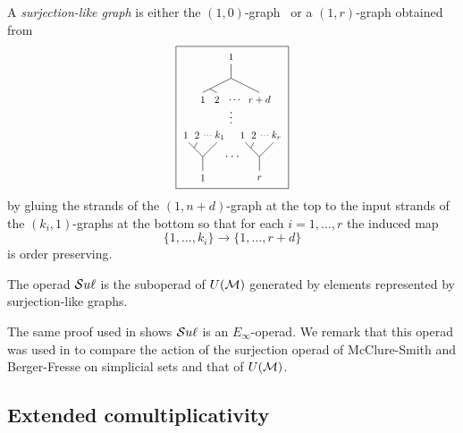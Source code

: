 A \textit{surjection-like graph} is either the $(1,0)$-graph \counit\ or a $(1, r)$-graph obtained from
\[
	\def\r{.8}
	\boxed{\begin{tikzpicture}[scale=.4]
	\node[scale=\r] at (5,8){$1$};

	\draw (3,5.5)--(5,6.5)--(5,7.5);
	\draw (7,5.5)--(5,6.5);
	\draw (4,5.5)--(3.5,5.75);

	\node[scale=\r] at (3,5){$1$};
	\node[scale=\r] at (4,5){$2$};
	\node[scale=\r] at (5.3,5){$\dots$};
	\node[scale=\r] at (7,5){$r+d$};

	\node at (5,4){$\vdots$};

	\node[scale=\r] at (1.8, 2.5){$1$};
	\node[scale=\r] at (2.6, 2.5){$2$};
	\node[scale=\r*.7] at (3.4, 2.5){$\dots$};
	\node[scale=\r] at (4.2, 2.5){$k_1$};

	\draw (2,2)--(3,1)--(3,0);
	\draw (4,2)--(3,1);
	\draw (2.6,2)--(2.4,1.6);

	\node[scale=\r] at (3,-.5){$1$};

	\node at (5,1){\ $\cdots$};

	\node[scale=\r] at (5.8, 2.5){$1$};
	\node[scale=\r] at (6.6, 2.5){$2$};
	\node[scale=\r*.7] at (7.4, 2.5){$\dots$};
	\node[scale=\r] at (8.2, 2.5){$k_r$};

	\draw (6,2)--(7,1)--(7,0);
	\draw (8,2)--(7,1);
	\draw (6.6,2)--(6.4,1.6);

	\node[scale=\r] at (7,-.5){$r$};
	\end{tikzpicture}}
\]
by gluing the strands of the $(1,n+d)$-graph at the top to the input strands of the $(k_i,1)$-graphs at the bottom so that for each $i = 1, \dots, r$ the induced map
\[
\{1, \dots, k_i\} \to \{1, \dots, r+d\}
\]
is order preserving.

\begin{definition}
	The operad $\mathcal{S}u\ell$ is the suboperad of $U(\mathcal{M})$ generated by elements represented by surjection-like graphs.
\end{definition}

The same proof used in \cite[Theorem 3.3.]{medina2020prop1} shows $\mathcal{S}u\ell$ is an $E_\infty$-operad.
We remark that this operad was used in \cite[Theorem A.11.]{medina2020prop1} to compare the action of the surjection operad of McClure-Smith \cite{mcclure2003multivariable} and Berger-Fresse \cite{berger2004combinatorial} on simplicial sets and that of $U(\mathcal{M})$.

\subsection{Extended comultiplicativity} \label{ss:extended comultiplicativity}

